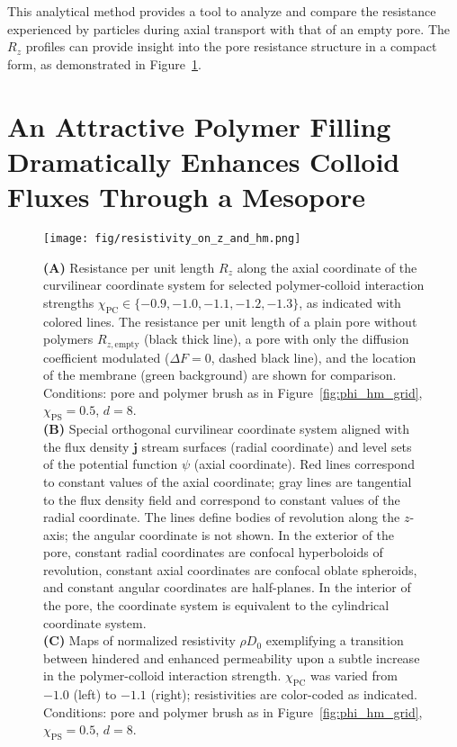 \documentclass[12pt, a4paper]{article}
\begin{document}
This analytical method provides a tool to analyze and compare the resistance experienced by particles during axial transport with that of an empty pore.
The $R_z$ profiles can provide insight into the pore resistance structure in a compact form, as demonstrated in Figure~\ref{fig:R_map}.


\section{An Attractive Polymer Filling Dramatically Enhances Colloid Fluxes Through a Mesopore}

\begin{figure}
    \centering
    \texttt{[image: fig/resistivity\_on\_z\_and\_hm.png]}
    \caption{
    \textbf{(A)} Resistance per unit length $R_{z}$ along the axial coordinate of the curvilinear coordinate system for selected polymer-colloid interaction strengths $\chi_{\textrm{PC}} \in \{ -0.9, -1.0, -1.1, -1.2, -1.3\}$, as indicated with colored lines.
    The resistance per unit length of a plain pore without polymers $R_{z, \textrm{empty}}$ (black thick line), a pore with only the diffusion coefficient modulated ($\Delta F = 0$, dashed black line), and the location of the membrane (green background) are shown for comparison. 
    Conditions: pore and polymer brush as in Figure~\ref{fig:phi_hm_grid}, $\chi_{\textrm{PS}}=0.5$, $d=8$.
    \\
    \textbf{(B)} Special orthogonal curvilinear coordinate system aligned with the flux density $\bm{j}$ stream surfaces (radial coordinate) and level sets of the potential function $\psi$ (axial coordinate).
    Red lines correspond to constant values of the axial coordinate; gray lines are tangential to the flux density field and correspond to constant values of the radial coordinate.
    The lines define bodies of revolution along the $z$-axis; the angular coordinate is not shown.
    In the exterior of the pore, constant radial coordinates are confocal hyperboloids of revolution, constant axial coordinates are confocal oblate spheroids, and constant angular coordinates are half-planes.
    In the interior of the pore, the coordinate system is equivalent to the cylindrical coordinate system.
    \\
    \textbf{(C)} Maps of normalized resistivity $\rho D_0$ exemplifying a transition between hindered and enhanced permeability upon a subtle increase in the polymer-colloid interaction strength.
    $\chi_{\textrm{PC}}$ was varied from $-1.0$ (left) to $-1.1$ (right); resistivities are color-coded as indicated. 
    Conditions: pore and polymer brush as in Figure~\ref{fig:phi_hm_grid}, $\chi_{\textrm{PS}}=0.5$, $d=8$.
    }
    \label{fig:R_map}
\end{figure}
\end{document}
